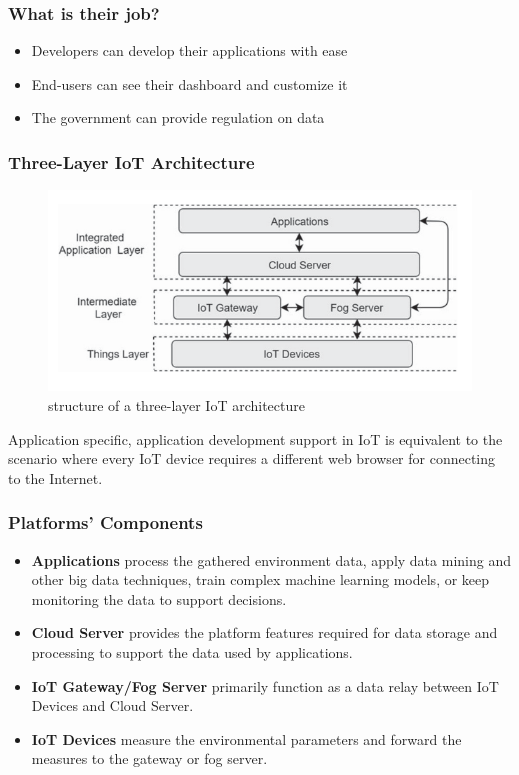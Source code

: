 \documentclass{../iot-lecture}
\begin{document}
\begin{frame}
  \frametitle{What is their job?}
  \begin{itemize}
    \item Developers can develop their applications with ease
    \item End-users can see their dashboard and customize it
    \item The government can provide regulation on data
  \end{itemize}
\end{frame}

\begin{frame}
  \frametitle{Three-Layer IoT Architecture}
  \begin{figure}
    \centering
    \includegraphics[width=\textwidth]{./img/three-layer-iot-architecture.png}
    \caption{structure of a three-layer IoT architecture}
  \end{figure}
\end{frame}

\begin{frame}
  \begin{block}{}
    Application specific, application development support in IoT is equivalent to
    the scenario where every IoT device requires a different web browser for connecting
    to the Internet.
  \end{block}
\end{frame}

\begin{frame}
  \frametitle{Platforms' Components}
  \begin{itemize}
    \item \textbf{\color{Cyan} Applications} process the gathered environment data, apply data mining and other big data
      techniques, train complex machine learning models, or keep monitoring the data to support decisions.
    \item \textbf{\color{YellowOrange} Cloud Server} provides the platform features required for data storage and processing to support
      the data used by applications.
    \item \textbf{\color{LimeGreen} IoT Gateway/Fog Server} primarily function as a data relay between IoT Devices and Cloud Server.
    \item \textbf{\color{RubineRed} IoT Devices} measure the environmental parameters and forward the measures to the gateway or fog server.
  \end{itemize}
\end{frame}
\end{document}
